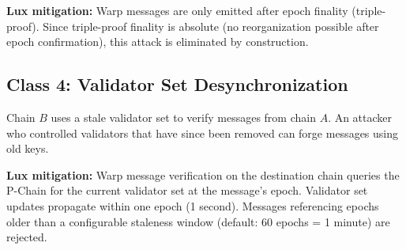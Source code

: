\textbf{Lux mitigation:} Warp messages are only emitted after epoch finality (triple-proof). Since triple-proof finality is absolute (no reorganization possible after epoch confirmation), this attack is eliminated by construction.

\subsection{Class 4: Validator Set Desynchronization}

Chain $B$ uses a stale validator set to verify messages from chain $A$. An attacker who controlled validators that have since been removed can forge messages using old keys.

\textbf{Lux mitigation:} Warp message verification on the destination chain queries the P-Chain for the current validator set at the message's epoch. Validator set updates propagate within one epoch (1 second). Messages referencing epochs older than a configurable staleness window (default: 60 epochs = 1 minute) are rejected.

